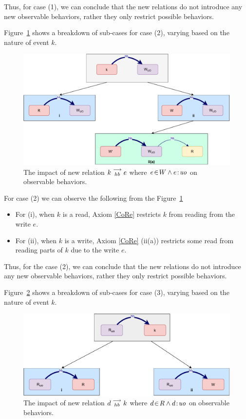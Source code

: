     Thus, for case (1), we can conclude that the new relations do not introduce any new observable behaviors, rather they only restrict possible behaviors.
    
    Figure~\ref{reord:case2} shows a breakdown of sub-cases for case (2), varying based
    on the nature of event $k$.
    \begin{figure}[H]
        \centering
        \includegraphics[scale=0.6]{4.InstructionReordering/4.ValidReorderingCandidate/ProofParts/Part4/part4(b).pdf}
        \caption{The impact of new relation $k\stackrel{\longrightarrow}{_{hb}}e$ where $e\!\in\!W \wedge e\!:\!\textit{uo}$ on observable behaviors.}
        \label{reord:case2}
    \end{figure}
          
    For case (2) we can observe the following from the Figure~\ref{reord:case2} 
    \begin{itemize}
        \item For (i), when $k$ is a read, Axiom \ref{CoRe} restricts $k$ from reading from the write $e$. 
        \item For (ii), when $k$ is a write, Axiom \ref{CoRe} (ii(a)) restricts some read from reading parts of $k$ due to the write $e$.   
    \end{itemize}

    Thus, for the case (2), we can conclude that the new relations do not introduce any new observable behaviors, rather they only restrict possible behaviors.
    
    Figure~\ref{reord:case3} shows a breakdown of sub-cases for case (3), varying based on the nature of event $k$.
    \begin{figure}[H]
        \centering
        \includegraphics[scale=0.6]{4.InstructionReordering/4.ValidReorderingCandidate/ProofParts/Part4/part4(c).pdf}
        \caption{The impact of new relation $d\stackrel{\longrightarrow}{_{hb}}k$ where $d\!\in\!R \wedge d\!:\!\textit{uo}$ on observable behaviors.}
        \label{reord:case3}
    \end{figure}
    
